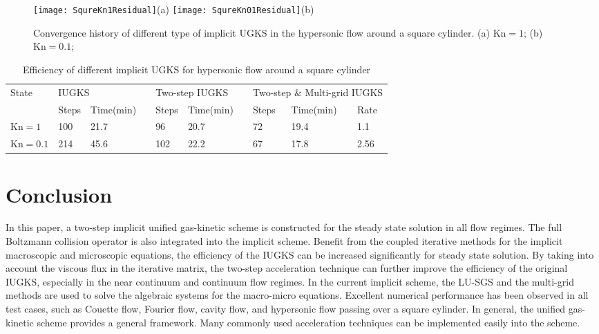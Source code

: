 \documentclass[3p,12pt]{elsarticle}
\begin{document}
	
	\begin{figure}
		\centering
		\texttt{[image: SqureKn1Residual]}{(a)}
		\texttt{[image: SqureKn01Residual]}{(b)}
		\caption{Convergence history of different type of implicit UGKS in the hypersonic flow around a square cylinder. (a) $\mathrm{Kn} = 1$; (b) $\mathrm{Kn} = 0.1$;}
		\label{SqureResidual}
	\end{figure}
	
	
	\begin{table}
		\caption{Efficiency of different implicit UGKS for hypersonic flow around a square cylinder}
		\begin{tabular}{llllllllll}
			\hline
			\multirow{2}{*}{State} & \multicolumn{2}{l}{IUGKS} &  & \multicolumn{2}{l}{Two-step IUGKS} &  & \multicolumn{3}{l}{Two-step $\&$ Multi-grid IUGKS} \\ \cline{2-10}
			& Steps & Time(min) &  & Steps & Time(min) &  & Steps & Time(min) & Rate \\ \hline
			$\mathrm{Kn} = 1$   & 100    & 21.7      &  & 96    & 20.7      &  & 72    & 19.4      & 1.1 \\
			$\mathrm{Kn} = 0.1$ & 214   & 45.6      &  & 102   & 22.2      &  & 67    & 17.8      & 2.56  \\ \hline
		\end{tabular}
		\label{Squreeff}
	\end{table}
	
	\section{Conclusion}\label{conclusion}
	In this paper, a two-step implicit unified gas-kinetic scheme is constructed for the steady state solution in all flow regimes. The full Boltzmann collision operator is also integrated into the implicit scheme.
	Benefit from the coupled iterative methods for the implicit macroscopic and microscopic equations,
	the efficiency of the IUGKS can be increased significantly for steady state solution. 
By taking into account the viscous flux in the iterative matrix, the two-step acceleration technique can further improve the efficiency of the original IUGKS, especially in the near continuum and continuum flow regimes.
	In the current implicit scheme, the LU-SGS and the multi-grid methods are used to solve the algebraic systems for the macro-micro equations.
	Excellent numerical performance has been observed in all test cases, such as Couette flow, Fourier flow, cavity flow, and hypersonic flow passing over a square cylinder.
	In general, the unified gas-kinetic scheme provides a general framework. Many commonly used acceleration techniques can be implemented easily into the scheme. 
	
\end{document}

